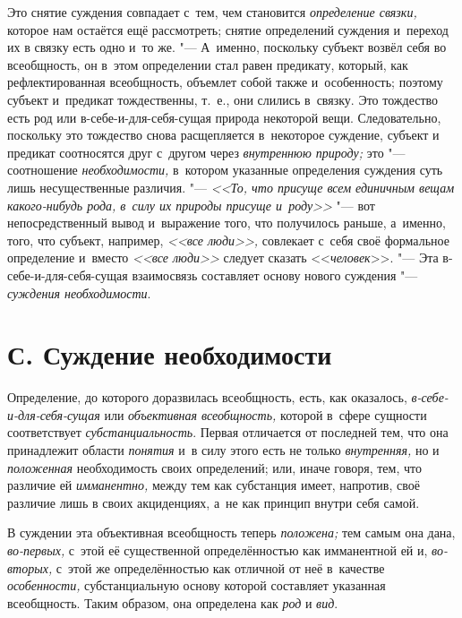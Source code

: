 Это снятие суждения совпадает с~тем, чем становится {\em определение связки,}
которое нам остаётся ещё рассмотреть; снятие определений суждения и~переход их
в связку есть одно и~то же. "--- А~именно, поскольку субъект возвёл себя во
всеобщность, он в~этом определении стал равен предикату, который, как
рефлектированная всеобщность, объемлет собой также и~особенность; поэтому
субъект и~предикат тождественны, т.~е., они слились в~связку. Это тождество
есть род или в-себе-и-для-себя-сущая природа некоторой вещи. Следовательно,
поскольку это тождество снова расщепляется в~некоторое суждение, субъект и
предикат соотносятся друг с~другом через {\em внутреннюю природу;} это "---
соотношение {\em необходимости,} в~котором указанные определения суждения суть
лишь несущественные различия. "--- {\em <<То, что присуще всем единичным вещам
какого-нибудь рода, в~силу их природы присуще и~роду>>} "--- вот
непосредственный вывод и~выражение того, что получилось раньше, а~именно, того,
что субъект, например, {\em <<все люди>>,} совлекает с~себя своё формальное
определение и~вместо {\em <<все люди>>} следует сказать <<{\em человек}>>. "---
Эта в-себе-и-для-себя-сущая взаимосвязь составляет основу нового суждения "---
{\em суждения необходимости}.

\section[С. Суждение необходимости]{С. Суждение необходимости}

Определение, до которого доразвилась всеобщность, есть, как
оказалось, {\em в-себе-и-для-себя-сущая} или {\em объективная
всеобщность,} которой в~сфере сущности соответствует {\em субстанциальность}.
Первая отличается от последней тем, что она принадлежит
области {\em понятия} и~в силу этого есть не только {\em внутренняя,} но и
{\em положенная} необходимость своих определений; или, иначе говоря, тем, что
различие ей {\em имманентно,}
между тем как субстанция имеет, напротив, своё различие лишь
в своих акциденциях, а~не как принцип внутри себя самой.

В суждении эта объективная всеобщность теперь {\em положена;} тем самым
она дана, {\em во-первых,} с~этой её существенной определённостью как
имманентной ей и, {\em во-вторых,} с~этой
же определённостью как отличной от неё в~качестве {\em особенности,}
субстанциальную основу которой составляет указанная
всеобщность. Таким образом, она определена как {\em род} и {\em вид}.


